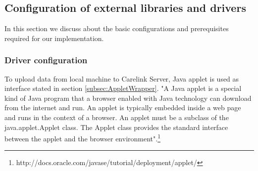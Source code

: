 \documentclass[article,type=msc,colorback,accentcolor=tud9c,twoside,11pt]{tudthesis}
\begin{document}
\subsection{Configuration of external libraries and drivers}
In this section we discuss about the basic configurations and prerequisites required for our implementation.
\subsubsection{Driver configuration}
To upload data from local machine to Carelink Server, Java applet is  used as interface stated in section \ref{subsec:AppletWrapper}. "A Java applet is a special kind of Java program that a browser enabled with Java technology can download from the internet and run. An applet is typically embedded inside a web page and runs in the context of a browser. An applet must be a subclass of the java.applet.Applet class. The Applet class provides the standard interface between the applet and the browser environment".\footnote{http://docs.oracle.com/javase/tutorial/deployment/applet/}
\end{document}
